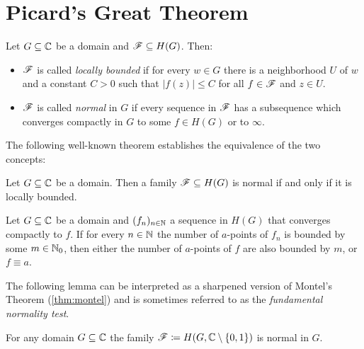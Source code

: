 \section{Picard's Great Theorem}
\label{sec:picards-great-theorem}

\begin{definition} \label{def:normal-family}
    Let $G \subseteq \mathbb{C}$ be a domain and $\mathscr{F} \subseteq H(G)$. Then:
    \begin{itemize}
        \item $\mathscr{F}$ is called \emph{locally bounded} if for every $w \in G$ there is a neighborhood $U$ of $w$ and a constant $C > 0$ such that $\vert f(z) \vert \leq C$ for all $f \in \mathscr{F}$ and $z \in U$.
        \item $\mathscr{F}$ is called \emph{normal} in $G$ if every sequence in $\mathscr{F}$ has a subsequence which converges compactly in $G$ to some $f \in H(G)$ or to $\infty$.
    \end{itemize}
\end{definition}

The following well-known theorem establishes the equivalence of the two concepts:

\begin{theorem}[Montel] \label{thm:montel}
    Let $G \subseteq \mathbb{C}$ be a domain. Then a family $\mathscr{F} \subseteq H(G)$ is normal if and only if it is locally bounded.
\end{theorem}

\begin{theorem}[Hurwitz] \label{thm:hurwitz}
    Let $G \subseteq \mathbb{C}$ be a domain and $(f_n)_{n \in \mathbb{N}}$ a sequence in $H(G)$ that converges compactly to $f$. If for every $n \in \mathbb{N}$ the number of $a$-points of $f_n$ is bounded by some $m \in \mathbb{N}_0$, then either the number of $a$-points of $f$ are also bounded by $m$, or $f \equiv a$.
\end{theorem}

The following lemma can be interpreted as a sharpened version of Montel's Theorem (\ref{thm:montel}) and is sometimes referred to as the \emph{fundamental normality test}.

\begin{lemma} \label{lem:montel-sharpened}
    For any domain $G \subseteq \mathbb{C}$ the family $\mathscr{F} \coloneqq H(G, \mathbb{C} \setminus \{ 0, 1 \})$ is normal in $G$.
\end{lemma}

